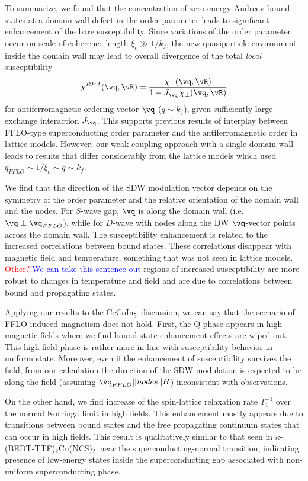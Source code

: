 \documentclass[prb,aps,showpacs,amsmath,twocolumn,10pt]{revtex4-1}
\newcommand{\blue}{\textcolor{blue}}
\newcommand{\red}{\textcolor{red}}
\newcommand{\cecoin}{CeCoIn$_5$}
\newcommand{\kbtf}{$\kappa$-(BEDT-TTF)$_2$Cu(NCS)$_2$}
\begin{document}
To summarize, we found that the concentration of zero-energy Andreev bound states at a domain wall 
defect in the order parameter leads to significant enhancement of the bare 
susceptibility. Since variations of the order parameter occur on scale of coherence length $\xi_c \gg 1/k_f$, 
the new quasiparticle environment inside the domain wall may lead to overall divergence of the total 
\emph{local} susceptibility
$$
\chi^{RPA}(\vq,\vR) = \frac{ \chi_\perp(\vq,\vR)}{1 - J_\vq \, \chi_\perp(\vq,\vR) }
$$
for antiferromagnetic ordering vector $\vq$ ($q \sim k_f$), given sufficiently 
large exchange interaction $J_\vq$. This supports previous results of interplay between FFLO-type  
superconducting order parameter and the antiferromagnetic order in lattice models.\cite{Yanase2009abs,Marcin2009}
However, our weak-coupling approach with a single domain wall leads to results that differ 
considerably from the lattice models which used $q_{FFLO} \sim 1/\xi_c \sim q \sim k_f$. 

We find that the direction of the SDW modulation vector depends on the symmetry of 
the order parameter and the relative orientation of the domain wall and the nodes. 
For $S$-wave gap, $\vq$ is along the domain wall (i.e. $\vq \perp \vq_{FFLO}$), 
while for $D$-wave with nodes along the DW $\vq$-vector points across the domain wall. 
The susceptibility enhancement is related to the increased correlations between 
bound states. 
These correlations disappear with magnetic field and temperature, something that was not seen in lattice models. 
\red{Other?!}\blue{We can take this sentence out} regions of increased
susceptibility are more robust to changes in temperature and field and are due
to correlations between bound and propagating states. 

Applying our results to the \cecoin\ discussion, we can say that the scenario of FFLO-induced magnetism 
does not hold. First, the Q-phase appears in high magnetic fields\cite{cecoin5_Kenzelmann, cecoin5_Kenzelmann2} 
where we find bound state enhancement effects are wiped out. 
This high-field phase is rather more in line with susceptibility behavior in uniform state.\cite{sc_afm_kato,Rosemeyer2014} 
Moreover, even if the enhancement of susceptibility survives the field, 
from our calculation the direction of the SDW modulation is expected to be along the field 
(assuming $\vq_{FFLO} || nodes || H$) inconsistent with observations.\cite{Gerber2014}

On the other hand, we find increase of the spin-lattice relaxation rate $T_1^{-1}$ 
over the normal Korringa limit in high fields. This enhancement mostly appears due to transitions 
between bound states and the free propagating continuum states that can occur in high fields. 
This result is
qualitatively similar to that seen in \kbtf\ near the superconducting-normal transition,\cite{Mayaffre2014} 
indicating presence of low-energy states inside the superconducting gap associated with 
non-uniform superconducting phase. 
\end{document}
